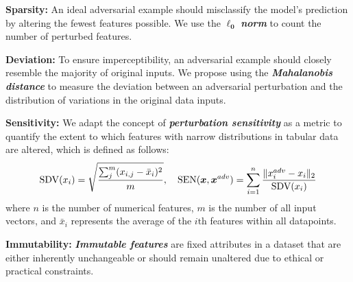 \documentclass[portrait,a0paper]{baposter}
\begin{document}
\begin{poster}
{    \vspace{0.3em}
    \textbf{\color{blue}Sparsity:} An ideal adversarial example should misclassify the model's prediction by altering the fewest features possible. We use the $\bm{\ell_0}$ \textbf{\textit{norm}} to count the number of perturbed features.

    \vspace{0.3em}
    \textbf{\color{blue}Deviation:} To ensure imperceptibility, an adversarial example should closely resemble the majority of original inputs. We propose using the \textbf{\textit{Mahalanobis distance}} to measure the deviation between an adversarial perturbation and the distribution of variations in the original data inputs.

    \vspace{0.3em}
    \textbf{\color{blue}Sensitivity:} We adapt the concept of \textit{\textbf{perturbation sensitivity}} as a metric to quantify the extent to which features with narrow distributions in tabular data are altered, which is defined as follows:
\vspace{-0.3em}
\begin{equation*}
       \text{SDV}(x_{i})= \sqrt{ \frac{ \sum^m_j ( x_{i,j}- \bar{x}_{i})^2 }{ m } }, \quad\text{SEN}(\bm{x}, \bm{x}^{adv})=\sum_{i=1}^n \frac{\Vert x^{adv}_{i} - x_{i} \Vert_2}{\text{SDV}(x_i)}
\vspace{-0.3em}
\end{equation*}
where $n$ is the number of numerical features, $m$ is the number of all input vectors, and $\bar{x}_{i}$ represents the average of the $i\text{th}$ features within all datapoints.
    


\vspace{0.3em}
\textbf{\color{blue}Immutability:} \textbf{\textit{Immutable features}} are fixed attributes in a dataset that are either inherently unchangeable or should remain unaltered due to ethical or practical constraints.

}
\end{poster}
\end{document}
